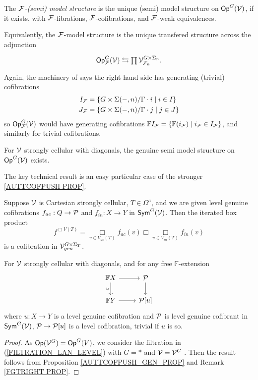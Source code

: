 \documentclass[a4paper,10pt]{article}%
\begin{document}
\begin{definition}
  The \textit{$\F$-(semi) model structure} is the unique (semi) model structure on $\Op^G(\V)$, if it exists, with $\F$-fibrations, $\F$-cofibrations, and $\F$-weak equivalences. 
\end{definition}
Equivalently, the $\F$-model structure is the unique transfered structure across the adjunction
\[
\begin{tikzcd}
  \Op^G_\F(\V) \leftrightarrows \prod \V^{G \times \Sigma_n}_{\F_n}.
\end{tikzcd}
\]
Again, the machinery of \cite{SS00} says the right hand side has generating (trivial) cofibrations
\begin{align*}
  I_\F &= \sets{G \times \Sigma(-,n)/\Gamma \cdot i}{i \in I}\\
  J_\F &= \sets{G \times \Sigma(-,n)/\Gamma \cdot j}{j \in J}
\end{align*}
so $\Op^G_\F(\V)$ would have generating cofibrations $\mathbb F I_\F = \sets{\mathbb F (i_\F)}{i_\F\in I_\F}$, and similarly for trivial cofibrations.


\begin{theorem}
  \label{G_OP_SEMI_MODEL_THM}
    For $\V$ strongly cellular with diagonals, the genuine semi model structure on $\Op^G(\V)$ exists.
\end{theorem}

The key technical result is an easy particular case of the stronger \ref{AUTTCOFPUSH PROP}.
\begin{proposition}
\label{AUTTCOFPUSH_GEN_PROP} 
  Suppose $\V$ is Cartesian strongly cellular, $T\in \Omega^a$, and we are given level genuine cofibrations $f_{ac}: Q \to \P$ and $f_{in}: X \to Y$ in  $\Sym^G(\V)$. Then the iterated box product 
  \[ 
  f^{\Box V(T)} = \mathop{\Box}\limits_{v \in V_{ac}(T)} f_{ac}(v) \Box \mathop{\Box}\limits_{v\in V_{in}(T)}f_{in}(v) 
  \] 
  is a cofibration in $\V^{G\times \Sigma_T}_{gen}$.
\end{proposition}

\begin{corollary}\label{CELLULAR_LEVEL_COFIB_PROP2} 
  For $\V$ strongly cellular with diagonals, and for any free $\mathbb F$-extension  
  \[ 
  \begin{tikzcd} 
    \mathbb F X \arrow[d, "u"'] \arrow[r] & \P \arrow[d]\\ 
    \mathbb F Y \arrow[r] & \P[u] 
  \end{tikzcd} 
  \] 
  where $u: X \to Y$ is a level genuine cofibration and $\P$ is level genuine cofibrant in $\Sym^G(\V)$, $\P \to \P[u]$ is a level cofibration, trivial if $u$ is so. 
\end{corollary}  
\begin{proof} 
  As $\Op(\V^G) = \Op^G(V)$, we consider the filtration in (\ref{FILTRATION_LAN_LEVEL}) with $G = *$ and $\V = \V^G$ . Then the result follows from Proposition \ref{AUTTCOFPUSH_GEN_PROP} and Remark \ref{FGTRIGHT PROP}.
\end{proof} 
\end{document}

